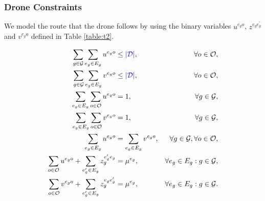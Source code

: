 
\subsubsection*{Drone Constraints}
\noindent
We model the route that the drone follows by using the binary variables $u^{e_go}$, $z^{e_ge^\prime_g}$ and $v^{e_go}$ defined in Table \ref{table:t2}.



\begin{align}
    \sum_{g\in \mathcal G}\sum_{e_g\in E_g}  u^{e_go} & \leq \RE{|\mathcal D|}, &\forall o\in \mathcal O,\label{st:DEnt}\\
    \sum_{g\in \mathcal G}\sum_{e_g\in E_g}  v^{e_go} & \leq \RE{|\mathcal D|}, &\forall o\in \mathcal O,\label{st:DExt} \\
    \sum_{e_g\in E_g} \sum_{o\in \mathcal O} u^{e_go} & = 1, &\forall g\in\mathcal G, \label{st:DEng}\\%
    \sum_{e_g\in E_g} \sum_{o\in \mathcal O} v^{e_go} & = 1, &\forall g\in\mathcal G, \label{st:DExg}\\%
    \sum_{e_g\in E_g} u^{e_go} & = \sum_{e_g\in E_g} v^{e_go}, &\forall g\in\mathcal G, \forall o\in \mathcal O, \label{st:Duv}\\%
     \sum_{o\in \mathcal O} u^{e_go} + \sum_{e^\prime_g\in E_g} z_g^{e^\prime_ge_g} & = \mu^{e_g}, &\forall e_g\in E_g:g\in\mathcal G, \label{st:DInu}\\
     \sum_{o\in \mathcal O} v^{e_go} + \sum_{e^\prime_g\in E_g} z_g^{e_ge^\prime_g} & = \mu^{e_g}, &\forall e_g\in E_g:g\in\mathcal G. \label{st:DInv}
\end{align}

